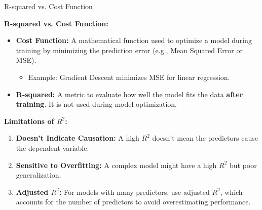 \begin{frame}{R-squared vs. Cost Function}

\textbf{R-squared vs. Cost Function:}
\begin{itemize}
    \item \textbf{Cost Function:} A mathematical function used to optimize a model during training by minimizing the prediction error (e.g., Mean Squared Error or MSE).
    \begin{itemize}
        \item Example: Gradient Descent minimizes MSE for linear regression.
    \end{itemize}
    \item \textbf{R-squared:} A metric to evaluate how well the model fits the data \textbf{after training}. It is not used during model optimization.
\end{itemize}

\textbf{Limitations of $R^2$:}
\begin{enumerate}
    \item \textbf{Doesn't Indicate Causation:} A high $R^2$ doesn’t mean the predictors cause the dependent variable.
    \item \textbf{Sensitive to Overfitting:} A complex model might have a high $R^2$ but poor generalization.
    \item \textbf{Adjusted $R^2$:} For models with many predictors, use adjusted $R^2$, which accounts for the number of predictors to avoid overestimating performance.
\end{enumerate}

\end{frame}
